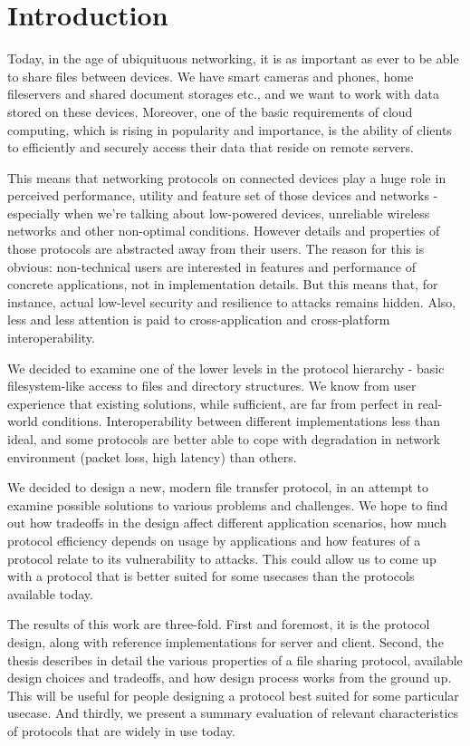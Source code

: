 \chapter*{Introduction}

Today, in the age of ubiquituous networking, it is as important as ever to be able to share files between
devices. We have smart cameras and phones, home fileservers and shared document storages etc., and we want to
work with data stored on these devices. Moreover, one of the basic requirements of cloud computing, which is
rising in popularity and importance, is the ability of clients to efficiently and securely access their data
that reside on remote servers.

This means that networking protocols on connected devices play a huge role in perceived performance, utility
and feature set of those devices and networks - especially when we're talking about low-powered devices,
unreliable wireless networks and other non-optimal conditions. However details and properties of those
protocols are abstracted away from their users. The reason for this is obvious: non-technical users are
interested in features and performance of concrete applications, not in implementation details. But this means
that, for instance, actual low-level security and resilience to attacks remains hidden. Also, less and less
attention is paid to cross-application and cross-platform interoperability.

We decided to examine one of the lower levels in the protocol hierarchy - basic filesystem-like access to
files and directory structures. We know from user experience that existing solutions, while sufficient, are
far from perfect in real-world conditions. Interoperability between different implementations less than ideal,
and some protocols are better able to cope with degradation in network environment (packet loss, high latency)
than others.

We decided to design a new, modern file transfer protocol, in an attempt to examine possible solutions to
various problems and challenges. We hope to find out how tradeoffs in the design affect different application
scenarios, how much protocol efficiency depends on usage by applications and how features of a protocol relate
to its vulnerability to attacks. This could allow us to come up with a protocol that is better suited for some
usecases than the protocols available today.

The results of this work are three-fold. First and foremost, it is the protocol design, along with reference
implementations for server and client. Second, the thesis describes in detail the various properties of a file
sharing protocol, available design choices and tradeoffs, and how design process works from the ground up.
This will be useful for people designing a protocol best suited for some particular usecase. And thirdly, we
present a summary evaluation of relevant characteristics of protocols that are widely in use today.
